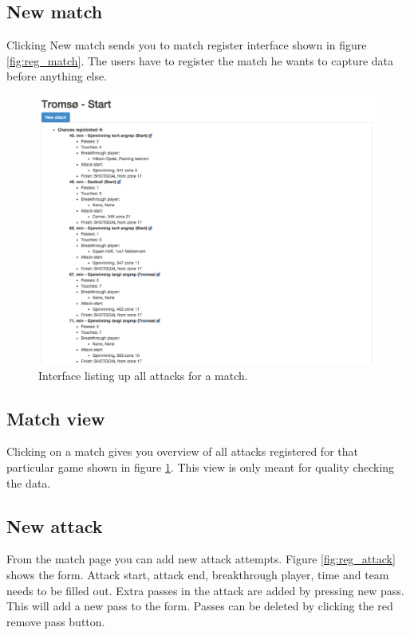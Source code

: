 \subsection{New match}
Clicking New match sends you to match register interface shown in figure \ref{fig:reg_match}. The users have to register the match he wants to capture data before anything else.


\begin{figure}[H]
\centering
\includegraphics[width=1\textwidth]{images/general/all_attacks.png}
\caption{Interface listing up all attacks for a match.}
\label{fig:all_attacks}
\end{figure}

\subsection{Match view}

Clicking on a match gives you overview of all attacks registered for that particular game shown in figure \ref{fig:all_attacks}. This view is only meant for quality checking the data.

\subsection{New attack}
From the match page you can add new attack attempts. Figure \ref{fig:reg_attack} shows the form. Attack start, attack end, breakthrough player, time and team needs to be filled out. Extra passes in the attack are added by pressing new pass. This will add a new pass to the form. Passes can be deleted by clicking the red remove pass button.

